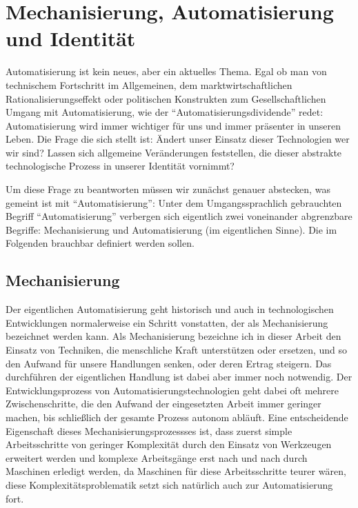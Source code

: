 \section {Mechanisierung, Automatisierung und Identität}

Automatisierung ist kein neues, aber ein aktuelles Thema.
Egal ob man von technischem Fortschritt im Allgemeinen, dem marktwirtschaftlichen Rationalisierungseffekt oder politischen Konstrukten zum Gesellschaftlichen Umgang mit Automatisierung, wie der \enquote{Automatisierungsdividende} redet: Automatisierung wird immer wichtiger für uns und immer präsenter in unseren Leben.
Die Frage die sich stellt ist: Ändert unser Einsatz dieser Technologien wer wir sind? Lassen sich allgemeine Veränderungen feststellen, die dieser abstrakte technologische Prozess in unserer Identität vornimmt?

Um diese Frage zu beantworten müssen wir zunächst genauer abstecken, was gemeint ist mit \enquote{Automatisierung}:
Unter dem Umgangssprachlich gebrauchten Begriff \enquote{Automatisierung} verbergen sich eigentlich zwei voneinander abgrenzbare Begriffe: Mechanisierung und Automatisierung (im eigentlichen Sinne). Die im Folgenden brauchbar definiert werden sollen.

\subsection {Mechanisierung}

Der eigentlichen Automatisierung geht historisch und auch in technologischen Entwicklungen normalerweise ein Schritt vonstatten, der als Mechanisierung bezeichnet werden kann.
Als Mechanisierung bezeichne ich in dieser Arbeit den Einsatz von Techniken, die menschliche Kraft unterstützen oder ersetzen, und so den Aufwand für unsere Handlungen senken, oder deren Ertrag steigern.
Das durchführen der eigentlichen Handlung ist dabei aber immer noch notwendig.
Der Entwicklungsprozess von Automatisierungstechnologien geht dabei oft mehrere Zwischenschritte, die den Aufwand der eingesetzten Arbeit immer geringer machen, bis schließlich der gesamte Prozess autonom abläuft.
Eine entscheidende Eigenschaft dieses Mechanisierungsprozessses ist, dass zuerst simple Arbeitsschritte von geringer Komplexität durch den Einsatz von Werkzeugen erweitert werden und komplexe Arbeitsgänge erst nach und nach durch Maschinen erledigt werden, da Maschinen für diese Arbeitsschritte teurer wären, diese Komplexitätsproblematik setzt sich natürlich auch zur Automatisierung fort.


